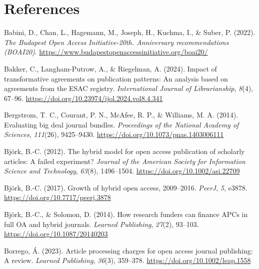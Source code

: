 \documentclass[a4paper,man,floatsintext,longtable,noextraspace,12pt]{apa6}
\newenvironment{CSLReferences}%
  {}%
  {\par}
\begin{document}
\hypertarget{references}{%
\section*{References}\label{references}}

\hypertarget{refs}{}
\begin{CSLReferences}{1}{0}
\leavevmode{}%
Babini, D., Chan, L., Hagemann, M., Joseph, H., Kuchma, I., \& Suber, P.
(2022). \emph{{The Budapest Open Access Initiative-20th. Anniversary
recommendations (BOAI20)}}.
\url{https://www.budapestopenaccessinitiative.org/boai20/}

\leavevmode{}%
Bakker, C., Langham-Putrow, A., \& Riegelman, A. (2024). Impact of
transformative agreements on publication patterns: An analysis based on
agreements from the ESAC registry. \emph{International Journal of
Librarianship}, \emph{8}(4), 67--96.
\url{https://doi.org/10.23974/ijol.2024.vol8.4.341}

\leavevmode{}%
Bergstrom, T. C., Courant, P. N., McAfee, R. P., \& Williams, M. A.
(2014). Evaluating big deal journal bundles. \emph{Proceedings of the
National Academy of Sciences}, \emph{111}(26), 9425--9430.
\url{https://doi.org/10.1073/pnas.1403006111}

\leavevmode{}%
Björk, B.-C. (2012). The hybrid model for open access publication of
scholarly articles: A failed experiment? \emph{Journal of the American
Society for Information Science and Technology}, \emph{63}(8),
1496--1504. \url{https://doi.org/10.1002/asi.22709}

\leavevmode{}%
Björk, B.-C. (2017). Growth of hybrid open access, 2009--2016.
\emph{PeerJ}, \emph{5}, e3878. \url{https://doi.org/10.7717/peerj.3878}

\leavevmode{}%
Björk, B.-C., \& Solomon, D. (2014). How research funders can finance
APCs in full OA and hybrid journals. \emph{Learned Publishing},
\emph{27}(2), 93--103. \url{https://doi.org/10.1087/20140203}

\leavevmode{}%
Borrego, Á. (2023). Article processing charges for open access journal
publishing: A review. \emph{Learned Publishing}, \emph{36}(3), 359--378.
\url{https://doi.org/10.1002/leap.1558}


\end{CSLReferences}
\end{document}
